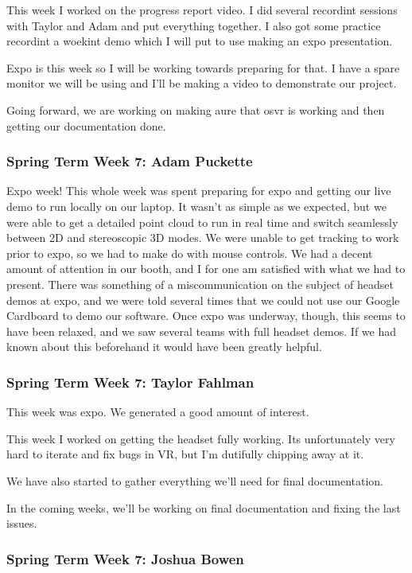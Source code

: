 \documentclass[draftclsnofoot,onecolumn]{IEEEtran}
\begin{document}
This week I worked on the progress report video. I did several recordint sessions with Taylor and Adam and put everything together. I also got some practice recordint a woekint demo which I will put to use making an expo presentation.

Expo is this week so I will be working towards preparing for that. I have a spare monitor we will be using and I'll be making a video to demonstrate our project.

Going forward, we are working on making aure that osvr is working and then getting our documentation done.

\subsubsection{Spring Term Week 7: Adam Puckette}

Expo week! This whole week was spent preparing for expo and getting our live demo to run locally on our laptop. It wasn't as simple as we expected, but we were able to get a detailed point cloud to run in real time and switch seamlessly between 2D and stereoscopic 3D modes. We were unable to get tracking to work prior to expo, so we had to make do with mouse controls. We had a decent amount of attention in our booth, and I for one am satisfied with what we had to present. There was something of a miscommunication on the subject of headset demos at expo, and we were told several times that we could not use our Google Cardboard to demo our software. Once expo was underway, though, this seems to have been relaxed, and we saw several teams with full headset demos. If we had known about this beforehand it would have been greatly helpful.

\subsubsection{Spring Term Week 7: Taylor Fahlman}

This week was expo. We generated a good amount of interest.

This week I worked on getting the headset fully working. Its unfortunately very hard to iterate and fix bugs in VR, but I'm dutifully chipping away at it.

We have also started to gather everything we'll need for final documentation.

In the coming weeks, we'll be working on final documentation and fixing the last issues.

\subsubsection{Spring Term Week 7: Joshua Bowen}
\end{document}
